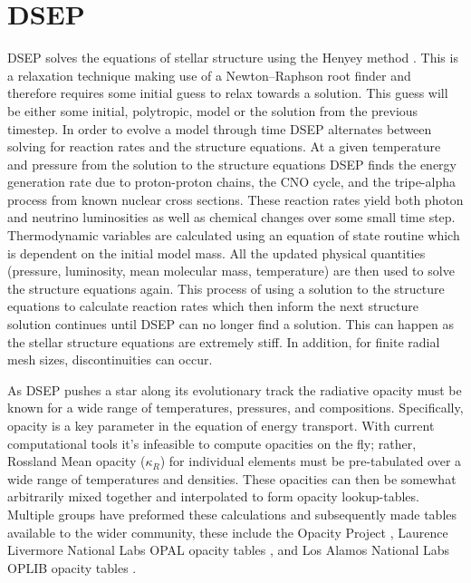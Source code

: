 \section{DSEP}
DSEP solves the equations of stellar structure using the Henyey method
\citep{Henyey1964}. This is a relaxation technique making use of a
Newton–Raphson root finder and therefore requires some initial guess to relax
towards a solution. This guess will be either some initial, polytropic, model
or the solution from the previous timestep.  In order to evolve a model through
time DSEP alternates between solving for reaction rates and the structure
equations. At a given temperature and pressure from the solution to the structure
equations DSEP finds the energy generation rate due to proton-proton chains,
the CNO cycle, and the tripe-alpha process from known nuclear cross sections.
These reaction rates yield both photon and neutrino luminosities as well as
chemical changes over some small time step. Thermodynamic variables are
calculated using an equation of state routine which is dependent on the initial
model mass. All the updated physical quantities (pressure, luminosity, mean
molecular mass, temperature) are then used to solve the structure equations
again. This process of using a solution to the structure equations to calculate
reaction rates which then inform the next structure solution continues until
DSEP can no longer find a solution.  This can happen as the stellar structure
equations are extremely stiff. In addition, for finite radial mesh sizes,
discontinuities can occur.

As DSEP pushes a star along its evolutionary track the radiative opacity must
be known for a wide range of temperatures, pressures, and compositions.
Specifically, opacity is a key parameter in the equation of energy transport.
With current computational tools it's infeasible to compute opacities on the
fly; rather, Rossland Mean opacity ($\kappa_{R}$) for individual elements must
be pre-tabulated over a wide range of temperatures and densities. These
opacities can then be somewhat arbitrarily mixed together and interpolated to
form opacity lookup-tables. Multiple groups have preformed these calculations
and subsequently made tables available to the wider community, these include
the Opacity Project \citep[OP][]{Seaton1994}, Laurence Livermore National Labs
OPAL opacity tables \citep{Iglesias1996}, and Los Alamos National Labs OPLIB
opacity tables \citep{Colgan2016}.

